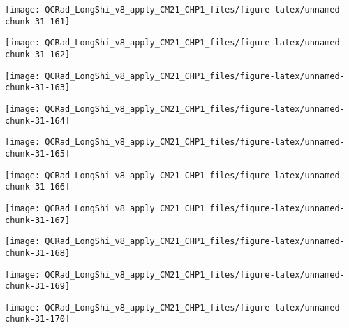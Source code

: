 \documentclass[
  10pt,
  a4paper,oneside]{article}
\begin{document}
\begin{center}\texttt{[image: QCRad\_LongShi\_v8\_apply\_CM21\_CHP1\_files/figure-latex/unnamed-chunk-31-161]} \end{center}

\begin{center}\texttt{[image: QCRad\_LongShi\_v8\_apply\_CM21\_CHP1\_files/figure-latex/unnamed-chunk-31-162]} \end{center}

\begin{center}\texttt{[image: QCRad\_LongShi\_v8\_apply\_CM21\_CHP1\_files/figure-latex/unnamed-chunk-31-163]} \end{center}

\begin{center}\texttt{[image: QCRad\_LongShi\_v8\_apply\_CM21\_CHP1\_files/figure-latex/unnamed-chunk-31-164]} \end{center}

\begin{center}\texttt{[image: QCRad\_LongShi\_v8\_apply\_CM21\_CHP1\_files/figure-latex/unnamed-chunk-31-165]} \end{center}

\begin{center}\texttt{[image: QCRad\_LongShi\_v8\_apply\_CM21\_CHP1\_files/figure-latex/unnamed-chunk-31-166]} \end{center}

\begin{center}\texttt{[image: QCRad\_LongShi\_v8\_apply\_CM21\_CHP1\_files/figure-latex/unnamed-chunk-31-167]} \end{center}

\begin{center}\texttt{[image: QCRad\_LongShi\_v8\_apply\_CM21\_CHP1\_files/figure-latex/unnamed-chunk-31-168]} \end{center}

\begin{center}\texttt{[image: QCRad\_LongShi\_v8\_apply\_CM21\_CHP1\_files/figure-latex/unnamed-chunk-31-169]} \end{center}

\begin{center}\texttt{[image: QCRad\_LongShi\_v8\_apply\_CM21\_CHP1\_files/figure-latex/unnamed-chunk-31-170]} \end{center}
\end{document}
